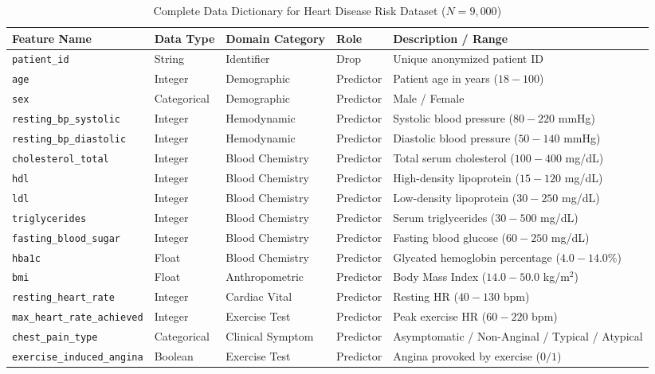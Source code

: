 \begin{table}[H]
\centering
\caption{Complete Data Dictionary for Heart Disease Risk Dataset ($N=9,000$)}
\label{tab:data_dictionary}
\small
\begin{tabular}{lllll}
\toprule
\textbf{Feature Name} & \textbf{Data Type} & \textbf{Domain Category} & \textbf{Role} & \textbf{Description / Range} \\
\midrule
\texttt{patient\_id} & String & Identifier & Drop & Unique anonymized patient ID \\
\texttt{age} & Integer & Demographic & Predictor & Patient age in years ($18 - 100$) \\
\texttt{sex} & Categorical & Demographic & Predictor & Male / Female \\
\texttt{resting\_bp\_systolic} & Integer & Hemodynamic & Predictor & Systolic blood pressure ($80 - 220$ mmHg) \\
\texttt{resting\_bp\_diastolic} & Integer & Hemodynamic & Predictor & Diastolic blood pressure ($50 - 140$ mmHg) \\
\texttt{cholesterol\_total} & Integer & Blood Chemistry & Predictor & Total serum cholesterol ($100 - 400$ mg/dL) \\
\texttt{hdl} & Integer & Blood Chemistry & Predictor & High-density lipoprotein ($15 - 120$ mg/dL) \\
\texttt{ldl} & Integer & Blood Chemistry & Predictor & Low-density lipoprotein ($30 - 250$ mg/dL) \\
\texttt{triglycerides} & Integer & Blood Chemistry & Predictor & Serum triglycerides ($30 - 500$ mg/dL) \\
\texttt{fasting\_blood\_sugar} & Integer & Blood Chemistry & Predictor & Fasting blood glucose ($60 - 250$ mg/dL) \\
\texttt{hba1c} & Float & Blood Chemistry & Predictor & Glycated hemoglobin percentage ($4.0 - 14.0\%$) \\
\texttt{bmi} & Float & Anthropometric & Predictor & Body Mass Index ($14.0 - 50.0$ kg/m$^2$) \\
\texttt{resting\_heart\_rate} & Integer & Cardiac Vital & Predictor & Resting HR ($40 - 130$ bpm) \\
\texttt{max\_heart\_rate\_achieved} & Integer & Exercise Test & Predictor & Peak exercise HR ($60 - 220$ bpm) \\
\texttt{chest\_pain\_type} & Categorical & Clinical Symptom & Predictor & Asymptomatic / Non-Anginal / Typical / Atypical \\
\texttt{exercise\_induced\_angina} & Boolean & Exercise Test & Predictor & Angina provoked by exercise ($0/1$) \\

\end{tabular}
\end{table}
